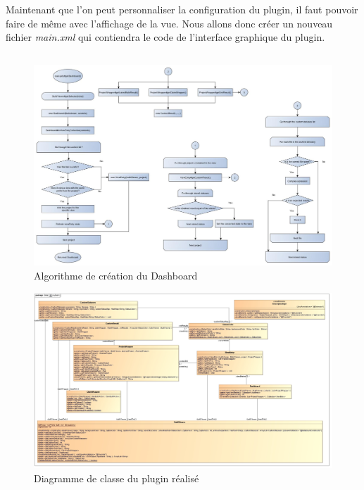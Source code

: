 Maintenant que l'on peut personnaliser la configuration du plugin, il faut pouvoir faire de même avec l'affichage de la vue. Nous allons donc créer un nouveau fichier \emph{main.xml} qui contiendra le code de l'interface graphique du plugin.




\subsection{}




\begin{figure}[!h]
  \centering
      \includegraphics[width=\textheight,angle=90]{images/dashboardGenesis.jpg}
  \caption{Algorithme de création du Dashboard}
	\label{figure:dashboardGenesis}
\end{figure}


\begin{figure}[!h]
  \centering
      \includegraphics[width=\textheight,angle=90]{images/myDash.jpg}
  \caption{Diagramme de classe du plugin réalisé}
	\label{figure:myDash}
\end{figure}
